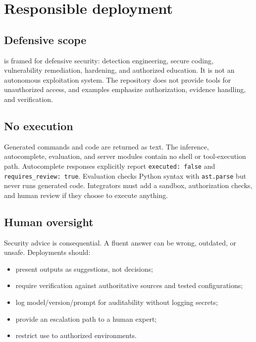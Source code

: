 \section{Responsible deployment}
\label{sec:responsible}

\subsection{Defensive scope}

\cyberlite{} is framed for defensive security: detection engineering, secure
coding, vulnerability remediation, hardening, and authorized education. It is not
an autonomous exploitation system. The repository does not provide tools for
unauthorized access, and examples emphasize authorization, evidence handling, and
verification.

\subsection{No execution}

Generated commands and code are returned as text. The inference, autocomplete,
evaluation, and server modules contain no shell or tool-execution path.
Autocomplete responses explicitly report \texttt{executed: false} and
\texttt{requires\_review: true}. Evaluation checks Python syntax with
\texttt{ast.parse} but never runs generated code. Integrators must add a sandbox,
authorization checks, and human review if they choose to execute anything.

\subsection{Human oversight}

Security advice is consequential. A fluent answer can be wrong, outdated, or
unsafe. Deployments should:

\begin{itemize}[leftmargin=1.4em]
  \item present outputs as suggestions, not decisions;
  \item require verification against authoritative sources and tested
  configurations;
  \item log model/version/prompt for auditability without logging secrets;
  \item provide an escalation path to a human expert;
  \item restrict use to authorized environments.
\end{itemize}

